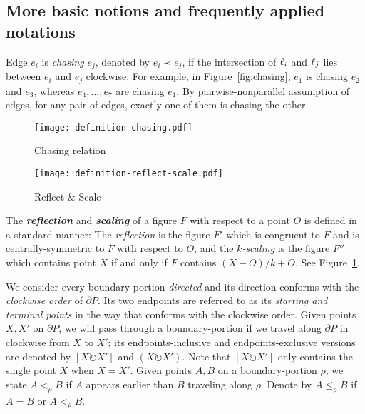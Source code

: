 \documentclass{ws-ijcga}
\begin{document}
\subsection{More basic notions and frequently applied notations}

\begin{definition}
Edge $e_i$ is \emph{chasing} $e_j$, denoted by $e_i\prec e_j$,
  if the intersection of $\ell_i$ and $\ell_j$ lies between $e_i$ and $e_j$ clockwise.
For example, in Figure~\ref{fig:chasing}, $e_1$ is chasing $e_2$ and $e_3$, whereas $e_4,\ldots,e_7$ are chasing $e_1$.
By pairwise-nonparallel assumption of edges, for any pair of edges, exactly one of them is chasing the other.
\end{definition}

\begin{figure}[b]
\begin{minipage}[b]{.45\textwidth}
\centering\texttt{[image: definition-chasing.pdf]}
\caption{Chasing relation}\label{fig:chasing}
\end{minipage}
\begin{minipage}[b]{.45\textwidth}
\centering\texttt{[image: definition-reflect-scale.pdf]}
\caption{Reflect \& Scale}\label{fig:scale-reflect}
\end{minipage}
\end{figure}

The \textbf{\emph{reflection}} and \textbf{\emph{scaling}} of a figure $F$ with respect to a point $O$ is defined in a standard manner:
The \emph{reflection} is the figure $F'$ which is congruent to $F$ and is centrally-symmetric to $F$ with respect to $O$,
and the \emph{$k$-scaling} is the figure $F''$ which contains point $X$ if and only if $F$ contains $(X-O)/k+O$. See Figure~\ref{fig:scale-reflect}.

We consider every boundary-portion \emph{directed} and its direction conforms with the \emph{clockwise order} of $\partial P$.
Its two endpoints are referred to as its \emph{starting and terminal points} in the way that conforms with the clockwise order.
Given points $X,X'$ on $\partial P$, we will pass through a boundary-portion if we travel along $\partial P$ in clockwise from $X$ to $X'$;
  its endpoints-inclusive and endpoints-exclusive versions are denoted by $[X\circlearrowright X']$ and $(X\circlearrowright X')$.
Note that $[X\circlearrowright X']$ only contains the single point $X$ when $X=X'$.
Given points $A,B$ on a boundary-portion $\rho$, we state $A<_\rho B$ if $A$ appears earlier than $B$ traveling along $\rho$. Denote by $A\leq_\rho B$ if $A=B$ or $A<_\rho B$.
\end{document}

